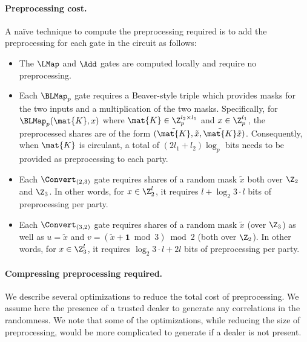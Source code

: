 \paragraph{Preprocessing cost.}
A na{\"i}ve technique to compute the preprocessing required is to add the preprocessing for each gate in the circuit as follows:

\begin{itemize}
\item The $\LMap$ and $\Add$ gates are computed locally and require no preprocessing.

\item Each $\BLMap_p$ gate requires a Beaver-style triple which provides masks for the two inputs and a multiplication of the two masks. Specifically, for $\BLMap_p(\mat{K}, x)$ where $\mat{K} \in \Z_p^{l_2 \times l_1}$ and $x \in \Z_p^{l_1}$, the preprocessed shares are of the form $(\tilde{\mat{K}}, \tilde{x}, \tilde{\mat{K}}\tilde{x})$. Consequently, when $\mat{K}$ is circulant, a total of $(2l_1 + l_2) \log_p$ bits needs to be provided as preprocessing to each party.

\item Each $\Convert_{(2,3)}$ gate requires shares of a random mask $\tilde{x}$ both over $\Z_2$ and $\Z_3$. In other words, for $x \in \Z_2^l$, it requires $l + \log_2{3} \cdot l$ bits of preprocessing per party.

\item Each $\Convert_{(3,2)}$ gate requires shares of a random mask $\tilde{x}$ (over $\Z_3$) as well as $u = \tilde{x}$ and $v = (\tilde{x} + \textbf{1} \bmod 3)\bmod 2$ (both over $\Z_2$). In other words, for $x \in \Z_3^l$, it requires $\log_2{3} \cdot l + 2l$ bits of preprocessing per party.
\end{itemize}

\paragraph{Compressing preprocessing required.}
We describe several optimizations to reduce the total cost of preprocessing. We assume here the presence of a trusted dealer to generate any correlations in the randomness. We note that some of the optimizations, while reducing the size of preprocessing, would be more complicated to generate if a dealer is not present.

